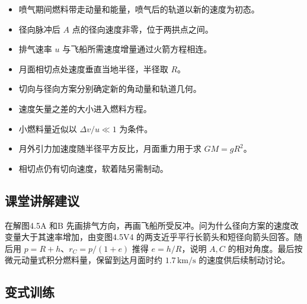\documentclass[UTF8,fontset=fandol,a4paper,11pt]{ctexart}
\begin{document}
\begin{itemize}
\item 喷气期间燃料带走动量和能量，喷气后的轨道以新的速度为初态。
\item 径向脉冲后 $A$ 点的径向速度非零，位于两拱点之间。
\item 排气速率 $u$ 与飞船所需速度增量通过火箭方程相连。
\item 月面相切点处速度垂直当地半径，半径取 $R$。
\item 切向与径向方案分别确定新的角动量和轨道几何。
\item 速度矢量之差的大小进入燃料方程。
\item 小燃料量近似以 $\Delta v/u\ll1$ 为条件。
\item 月外引力加速度随半径平方反比，月面重力用于求 $GM=gR^2$。
\item 相切点仍有切向速度，软着陆另需制动。
\end{itemize}



\subsection*{课堂讲解建议}

在解图4.5A 和B 先画排气方向，再画飞船所受反冲。问为什么径向方案的速度改变量大于其速率增加，由变图4.5V4 的两支近乎平行长箭头和短径向箭头回答。随后用 $p=R+h$、$r_C=p/(1+e)$ 推得 $e=h/R$，说明 $A,C$ 的相对角度。最后按微元动量式积分燃料量，保留到达月面时约 $1.7\,\mathrm{km/s}$ 的速度供后续制动讨论。



\subsection*{变式训练}
\end{document}
